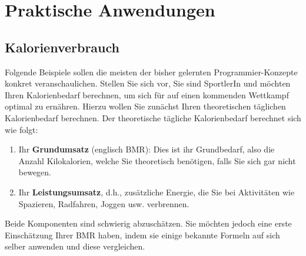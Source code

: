 \chapter{Praktische Anwendungen}\label{ch:K08_Anwendung}
\section{Kalorienverbrauch}

Folgende Beispiele sollen die meisten der bisher gelernten Programmier-Konzepte konkret veranschaulichen. Stellen Sie sich vor, Sie sind SportlerIn und möchten Ihren Kalorienbedarf berechnen, um sich für auf einen kommenden Wettkampf optimal zu ernähren. Hierzu wollen Sie zunächst Ihren theoretischen täglichen Kalorienbedarf berechnen. Der theoretische tägliche Kalorienbedarf berechnet sich wie folgt:
\begin{enumerate}
	\item Ihr \textbf{Grundumsatz} (englisch \gls{BMR}): Dies ist ihr Grundbedarf, also die Anzahl Kilokalorien, welche Sie theoretisch benötigen, falls Sie sich gar nicht bewegen.
	\item Ihr \textbf{Leistungsumsatz}, d.h., zusätzliche Energie, die Sie bei Aktivitäten wie Spazieren, Radfahren, Joggen usw. verbrennen.
\end{enumerate}

Beide Komponenten sind schwierig abzuschätzen. Sie möchten jedoch eine erste Einschätzung Ihrer \gls{BMR} haben, indem sie einige bekannte Formeln auf sich selber anwenden und diese vergleichen.

